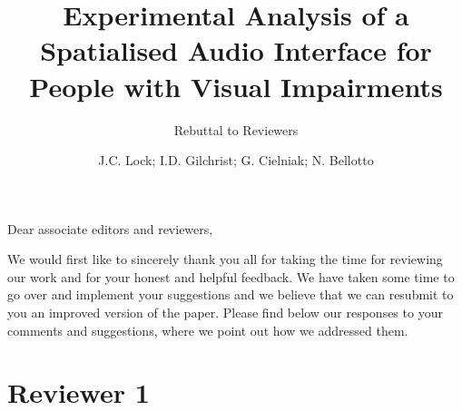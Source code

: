 \documentclass{scrartcl}
\begin{document}
\title{Experimental Analysis of a Spatialised Audio Interface for People with Visual Impairments}
\subtitle{Rebuttal to Reviewers}

\author{J.C. Lock; I.D. Gilchrist; G. Cielniak; N. Bellotto}

\maketitle

\noindent Dear associate editors and reviewers,

We would first like to sincerely thank you all for taking the time for reviewing our work and for your honest and helpful feedback.
We have taken some time to go over and implement your suggestions and we believe that we can resubmit to you an improved version of the paper. 
Please find below our responses to your comments and suggestions, where we point out how we addressed them.

\section*{Reviewer 1} 
\end{document}
